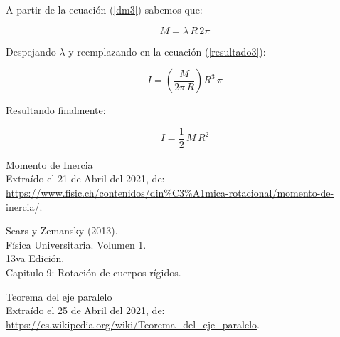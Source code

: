 \documentclass[letter,twoside,11pt]{article}
\begin{document}
A partir de la ecuación (\ref{dm3}) sabemos que:

\begin{equation*}
    M = \lambda\, R\, 2\pi
\end{equation*}

Despejando $\lambda$ y reemplazando en la ecuación (\ref{resultado3}):

\begin{equation*}
    I = \left( \frac{M}{2\pi\, R} \right) R^3\, \pi
\end{equation*}

Resultando finalmente:

\begin{equation}
    I = \frac{1}{2}\, M\, R^2
\end{equation}

\begin{thebibliography}{99}

 Momento de Inercia \\
Extraído el 21 de Abril del 2021, de: \\
\url{https://www.fisic.ch/contenidos/din%C3%A1mica-rotacional/momento-de-inercia/}.
 
 Sears y Zemansky (2013).\\
Física Universitaria. Volumen 1.\\
13va Edición.\\
Capitulo 9: Rotación de cuerpos rígidos.

 Teorema del eje paralelo \\
Extraído el 25 de Abril del 2021, de: \\
\url{https://es.wikipedia.org/wiki/Teorema_del_eje_paralelo}.

\end{thebibliography}
\end{document}
